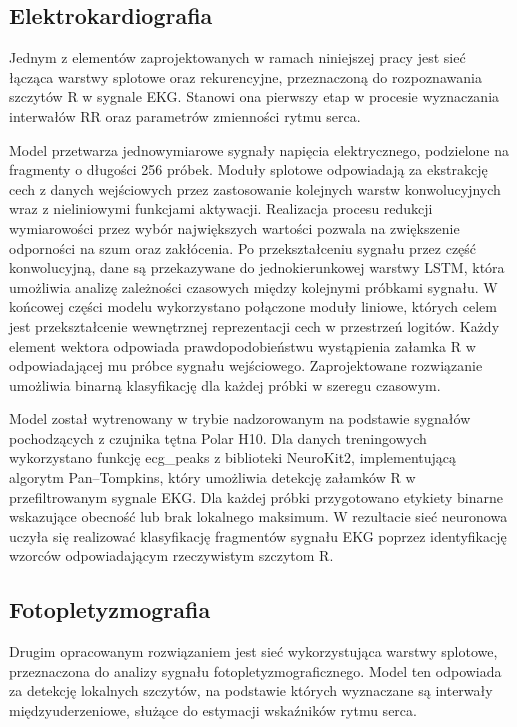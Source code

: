 \documentclass[journal]{IEEEtran}
\begin{document}
\subsection{Elektrokardiografia}
Jednym z elementów zaprojektowanych w ramach niniejszej pracy jest sieć łącząca warstwy splotowe oraz rekurencyjne, przeznaczoną do rozpoznawania szczytów R w sygnale EKG. Stanowi ona pierwszy etap w procesie wyznaczania interwałów RR oraz parametrów zmienności rytmu serca.

Model przetwarza jednowymiarowe sygnały napięcia elektrycznego, podzielone na fragmenty o długości 256 próbek. Moduły splotowe odpowiadają za ekstrakcję cech z danych wejściowych przez zastosowanie kolejnych warstw konwolucyjnych wraz z nieliniowymi funkcjami aktywacji. Realizacja procesu redukcji wymiarowości przez wybór największych wartości pozwala na zwiększenie odporności na szum oraz zakłócenia. Po przekształceniu sygnału przez część konwolucyjną, dane są przekazywane do jednokierunkowej warstwy LSTM, która umożliwia analizę zależności czasowych między kolejnymi próbkami sygnału. W końcowej części modelu wykorzystano połączone moduły liniowe, których celem jest przekształcenie wewnętrznej reprezentacji cech w przestrzeń logitów. Każdy element wektora odpowiada prawdopodobieństwu wystąpienia załamka R w odpowiadającej mu próbce sygnału wejściowego. Zaprojektowane rozwiązanie umożliwia binarną klasyfikację dla każdej próbki w szeregu czasowym.

Model został wytrenowany w trybie nadzorowanym na podstawie sygnałów pochodzących z czujnika tętna Polar H10. Dla danych treningowych wykorzystano funkcję ecg\_peaks z biblioteki NeuroKit2, implementującą algorytm Pan–Tompkins, który umożliwia detekcję załamków R w przefiltrowanym sygnale EKG. Dla każdej próbki przygotowano etykiety binarne wskazujące obecność lub brak lokalnego maksimum. W rezultacie sieć neuronowa uczyła się realizować klasyfikację fragmentów sygnału EKG poprzez identyfikację wzorców odpowiadającym rzeczywistym szczytom R.


\subsection{Fotopletyzmografia}
Drugim opracowanym rozwiązaniem jest sieć wykorzystująca warstwy splotowe, przeznaczona do analizy sygnału fotopletyzmograficznego. Model ten odpowiada za detekcję lokalnych szczytów, na podstawie których wyznaczane są interwały międzyuderzeniowe, służące do estymacji wskaźników rytmu serca.
\end{document}
